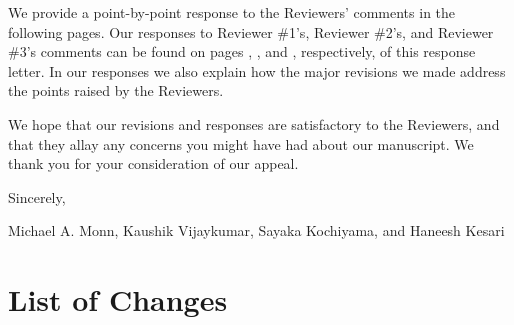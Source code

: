 \documentclass[11pt,letterpaper]{report}
\begin{document}
We  provide a point-by-point response to the Reviewers' comments in the following pages. Our responses to Reviewer \#1's, Reviewer \#2's, and Reviewer \#3's comments can be found on pages \pageref{rev1}, \pageref{rev2}, and \pageref{rev3}, respectively, of this response letter.  In our responses we also explain how the major revisions we made address the points raised by the Reviewers. 

We hope that our revisions and responses are satisfactory to the Reviewers, and that they allay any concerns  you might have had about our manuscript. We thank you for your consideration of our appeal.

\vspace{2em}
Sincerely,

Michael A. Monn, Kaushik Vijaykumar, Sayaka Kochiyama, and Haneesh Kesari


\clearpage
\pagestyle{plain}
\section*{List of Changes}
\label{LoCpage}
\end{document}
